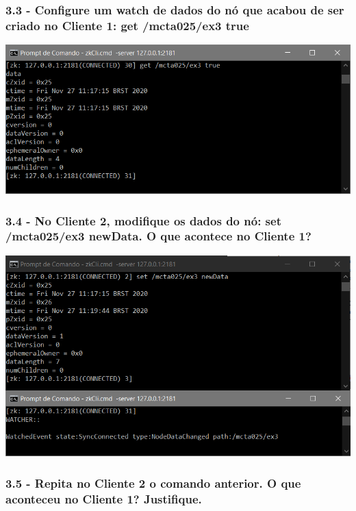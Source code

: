 \subsubsection{3.3 - Configure um watch de dados do nó que acabou de ser criado no
Cliente 1: get /mcta025/ex3 true}

\includegraphics{pratica3/prints/roteiro 3.3.PNG}

\subsubsection{3.4 - No Cliente 2, modifique os dados do nó: set /mcta025/ex3
newData. O que acontece no Cliente 1?}

\includegraphics{pratica3/prints/roteiro 3.4.PNG}

\subsubsection{3.5 - Repita no Cliente 2 o comando anterior. O que aconteceu no Cliente 1? Justifique.}

